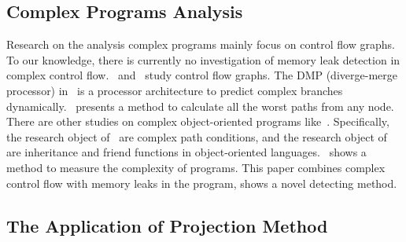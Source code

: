 \subsection{Complex Programs Analysis}
Research on the analysis complex programs mainly focus on control flow graphs. To our knowledge, there is currently no investigation of memory leak detection in complex control flow.~\cite{KJMP06} and~\cite{KFM13} study control flow graphs. The DMP (diverge-merge processor) in~\cite{KJMP06} is a processor architecture to predict complex branches dynamically.~\cite{KFM13} presents a method to calculate all the worst paths from any node. There are other studies on complex object-oriented programs like~\cite{LLQ16, MGDD14}. Specifically, the research object of~\cite{LLQ16} are complex path conditions, and the research object of~\cite{MGDD14} are inheritance and friend functions in object-oriented languages.~\cite{KK12} shows a method to measure the complexity of programs. This paper combines complex control flow with memory leaks in the program, shows a novel detecting method.

\subsection{The Application of Projection Method}

